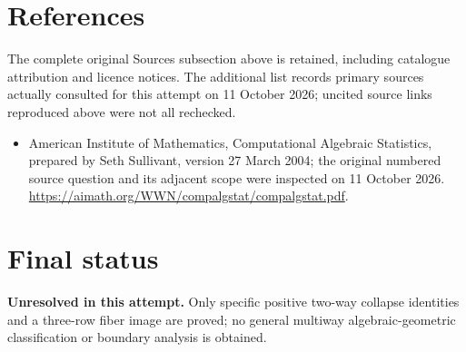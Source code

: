 \documentclass[11pt]{article}
\begin{document}
\section{References}
The complete original Sources subsection above is retained, including catalogue attribution and licence notices. The additional list records primary sources actually consulted for this attempt on 11 October 2026; uncited source links reproduced above were not all rechecked.
\begin{itemize}
\item American Institute of Mathematics, Computational Algebraic Statistics, prepared by Seth Sullivant, version 27 March 2004; the original numbered source question and its adjacent scope were inspected on 11 October 2026. \url{https://aimath.org/WWN/compalgstat/compalgstat.pdf}.
\end{itemize}
\section{Final status}
\textbf{Unresolved in this attempt.} Only specific positive two-way collapse identities and a three-row fiber image are proved; no general multiway algebraic-geometric classification or boundary analysis is obtained.
\end{document}
